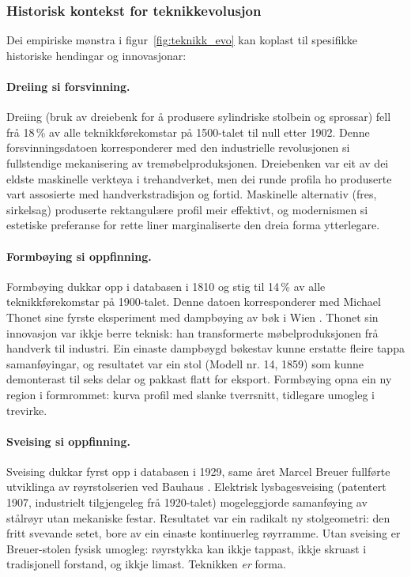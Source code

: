 \documentclass[10pt, a4paper, twocolumn]{article}
\begin{document}
\subsubsection{Historisk kontekst for teknikkevolusjon}

Dei empiriske mønstra i figur~\ref{fig:teknikk_evo} kan koplast til spesifikke historiske hendingar og innovasjonar:

\paragraph{Dreiing si forsvinning.} Dreiing (bruk av dreiebenk for å produsere sylindriske stolbein og sprossar) fell frå 18\,\% av alle teknikkførekomstar på 1500-talet til null etter 1902. Denne forsvinningsdatoen korresponderer med den industrielle revolusjonen si fullstendige mekanisering av tremøbelproduksjonen. Dreiebenken var eit av dei eldste maskinelle verktøya i trehandverket, men dei runde profila ho produserte vart assosierte med handverkstradisjon og fortid. Maskinelle alternativ (fres, sirkelsag) produserte rektangulære profil meir effektivt, og modernismen si estetiske preferanse for rette liner marginaliserte den dreia forma ytterlegare.

\paragraph{Formbøying si oppfinning.} Formbøying dukkar opp i databasen i 1810 og stig til 14\,\% av alle teknikkførekomstar på 1900-talet. Denne datoen korresponderer med Michael Thonet sine fyrste eksperiment med dampbøying av bøk i Wien \citep{thonet1976}. Thonet sin innovasjon var ikkje berre teknisk: han transformerte møbelproduksjonen frå handverk til industri. Ein einaste dampbøygd bøkestav kunne erstatte fleire tappa samanføyingar, og resultatet var ein stol (Modell nr. 14, 1859) som kunne demonterast til seks delar og pakkast flatt for eksport. Formbøying opna ein ny region i formrommet: kurva profil med slanke tverrsnitt, tidlegare umogleg i trevirke.

\paragraph{Sveising si oppfinning.} Sveising dukkar fyrst opp i databasen i 1929, same året Marcel Breuer fullførte utviklinga av røyrstolserien ved Bauhaus \citep{wilk1981}. Elektrisk lysbagesveising (patentert 1907, industrielt tilgjengeleg frå 1920-talet) mogeleggjorde samanføying av stålrøyr utan mekaniske festar. Resultatet var ein radikalt ny stolgeometri: den fritt svevande setet, bore av ein einaste kontinuerleg røyrramme. Utan sveising er Breuer-stolen fysisk umogleg: røyrstykka kan ikkje tappast, ikkje skruast i tradisjonell forstand, og ikkje limast. Teknikken \emph{er} forma.
\end{document}

